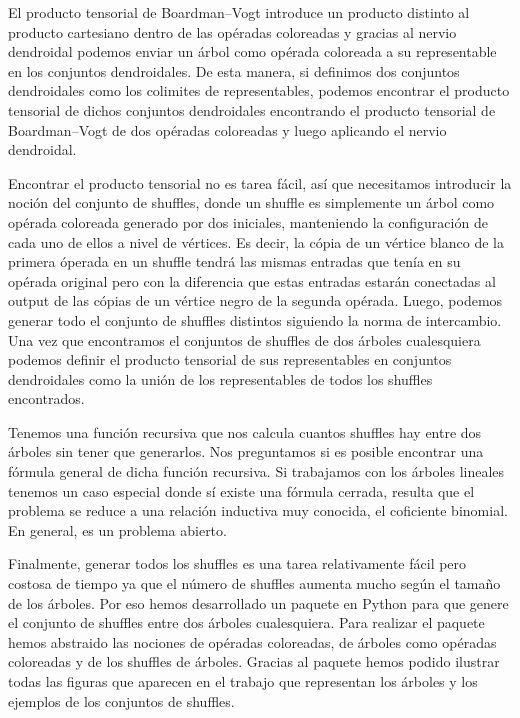 \documentclass[11pt,a4paper,openright,oneside]{article}
\numberwithin{equation}{section}
\theoremstyle{definition}
\begin{document}
El producto tensorial de Boardman--Vogt introduce un producto distinto al producto cartesiano dentro de las op\'eradas coloreadas y gracias al nervio dendroidal podemos enviar un \'arbol como op\'erada coloreada a su representable en los conjuntos dendroidales.
De esta manera, si definimos dos conjuntos dendroidales como los colimites de representables, podemos encontrar el producto tensorial de dichos conjuntos dendroidales encontrando el producto tensorial de Boardman--Vogt de dos op\'eradas coloreadas y luego aplicando el nervio dendroidal.

Encontrar el producto tensorial no es tarea f\'acil, as\'i que necesitamos introducir la noci\'on del conjunto de shuffles, donde un shuffle es simplemente un \'arbol como op\'erada coloreada generado por dos iniciales, manteniendo la configuraci\'on de cada uno de ellos a nivel de v\'ertices. Es decir, la c\'opia de un v\'ertice blanco de la primera \'operada en un shuffle tendr\'a las mismas entradas que ten\'ia en su op\'erada original pero con la diferencia que estas entradas estar\'an conectadas al output de las c\'opias de un v\'ertice negro de la segunda op\'erada.
Luego, podemos generar todo el conjunto de shuffles distintos siguiendo la norma de intercambio. Una vez que encontramos el conjuntos de shuffles de dos \'arboles cualesquiera podemos definir el producto tensorial de sus representables en conjuntos dendroidales como la uni\'on de los representables de todos los shuffles encontrados.

Tenemos una funci\'on recursiva que nos calcula cuantos shuffles hay entre dos \'arboles sin tener que generarlos. Nos preguntamos si es posible encontrar una f\'ormula general de dicha funci\'on recursiva. Si trabajamos con los \'arboles lineales tenemos un caso especial donde s\'i existe una f\'ormula cerrada, resulta que el problema se reduce a una relaci\'on inductiva muy conocida, el coficiente binomial. En general, es un problema abierto.

Finalmente, generar todos los shuffles es una tarea relativamente f\'acil pero costosa de tiempo ya que el n\'umero de shuffles aumenta mucho seg\'un el tama\~no de los \'arboles. Por eso hemos desarrollado un paquete en Python para que genere el conjunto de shuffles entre dos \'arboles cualesquiera.
Para realizar el paquete hemos abstraido las nociones de op\'eradas coloreadas, de \'arboles como op\'eradas coloreadas y de los shuffles de \'arboles.
Gracias al paquete hemos podido ilustrar todas las figuras que aparecen en el trabajo que representan los \'arboles y los ejemplos de los conjuntos de shuffles.
\end{document}
